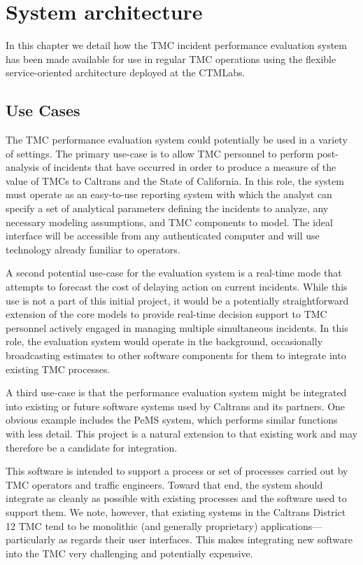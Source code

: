 \documentclass[12pt]{report}
\newcounter{time}
\begin{document}
\chapter{System architecture}
\label{sec:system-architecture}


In this chapter we detail how the \ac{TMC} incident performance evaluation
system has been made available for use in regular \ac{TMC} operations using the
flexible service-oriented architecture deployed at the \ac{CTMLabs}.

\section{Use Cases}
\label{sec:use-cases}


The \ac{TMC} performance evaluation system could potentially be used in a
variety of settings. The primary use-case is to allow \ac{TMC} personnel to
perform post-analysis of incidents that have occurred in order to produce a
measure of the value of \acp{TMC} to Caltrans and the State of California. In
this role, the system must operate as an easy-to-use reporting system with which
the analyst can specify a set of analytical parameters defining the incidents to
analyze, any necessary modeling assumptions, and \ac{TMC} components to
model. The ideal interface will be accessible from any authenticated computer
and will use technology already familiar to operators.

A second potential use-case for the evaluation system is a real-time
mode that attempts to forecast the cost of delaying action on current
incidents. While this use is not a part of this initial project, it
would be a potentially straightforward extension of the core models to
provide real-time decision support to \ac{TMC} personnel actively
engaged in managing multiple simultaneous incidents. In this role, the
evaluation system would operate in the background, occasionally
broadcasting estimates to other software components for them to
integrate into existing \ac{TMC} processes.

A third use-case is that the performance evaluation system might be integrated
into existing or future software systems used by Caltrans and its partners. One
obvious example includes the \ac{PeMS} system, which performs similar functions
with less detail. This project is a natural extension to that existing work and
may therefore be a candidate for integration.

This software is intended to support a process or set of processes carried out
by \ac{TMC} operators and traffic engineers.  Toward that end, the system should
integrate as cleanly as possible with existing processes and the software used
to support them.  We note, however, that existing systems in the Caltrans
District 12 \ac{TMC} tend to be monolithic (and generally proprietary)
applications---particularly as regards their user interfaces.  This makes
integrating new software into the \ac{TMC} very challenging and potentially
expensive.
\end{document}
